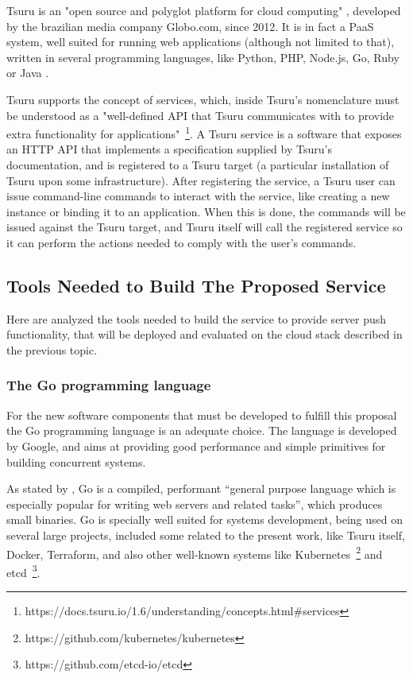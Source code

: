 Tsuru is an "open source and polyglot platform for cloud computing" \cite{vergara2014deployment}, developed by the brazilian media company Globo.com, since 2012. It is in fact a PaaS system, well suited for running web applications (although not limited to that), written in several programming languages, like Python, PHP, Node.js, Go, Ruby or Java \cite{costache2017resource}.

Tsuru supports the concept of services, which, inside Tsuru's nomenclature must be understood as a "well-defined API that Tsuru communicates with to provide extra functionality for applications"~\footnote{https://docs.tsuru.io/1.6/understanding/concepts.html\#services}. A Tsuru service is a software that exposes an HTTP API that implements a specification supplied by Tsuru's documentation, and is registered to a Tsuru target (a particular installation of Tsuru upon some infrastructure). After registering the service, a Tsuru user can issue command-line commands to interact with the service, like creating a new instance or binding it to an application. When this is done, the commands will be issued against the Tsuru target, and Tsuru itself will call the registered service so it can perform the actions needed to comply with the user's commands.

\subsection{Tools Needed to Build The Proposed Service}

Here are analyzed the tools needed to build the service to provide server push functionality, that will be deployed and evaluated on the cloud stack described in the previous topic.

\subsubsection{The Go programming language}

For the new software components that must be developed to fulfill this proposal the Go programming language is an adequate choice. The language is developed by Google, and aims at providing good performance and simple primitives for building concurrent systems.

As stated by , Go is a compiled, performant ``general purpose language which is especially popular for writing web servers and related tasks'', which produces small binaries. Go is specially well suited for systems development, being used on several large projects, included some related to the present work, like Tsuru itself, Docker, Terraform, and also other well-known systems like Kubernetes~\footnote{https://github.com/kubernetes/kubernetes} and etcd~\footnote{https://github.com/etcd-io/etcd}.

